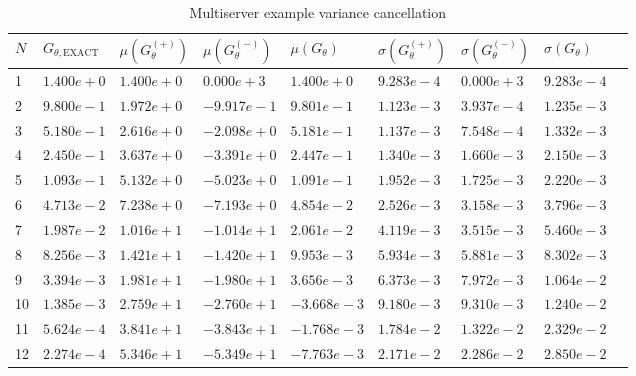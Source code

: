\begin{table}[!htb] 
\begin{center}
\begin{tabular}{@{}lllllllll@{}}
\toprule
    \(N\) &\(G_{\theta,\text{EXACT}}\) & \(\mu(G^{(+)}_\theta)\) & \(\mu(G^{(-)}_\theta)\)  & \(\mu(G_\theta)\) & \(\sigma(G^{(+)}_\theta)\) & \(\sigma(G^{(-)}_\theta)\)  & \(\sigma(G_\theta)\) \\  \midrule
    1 & \(1.400e+0\) &\(1.400e+0\) & \(0.000e+3\) & \(1.400e+0\) & \(9.283e-4\) & \(0.000e+3\) & \(9.283e-4\) &  \\ 
    2 & \(9.800e-1\) &\(1.972e+0\) & \(-9.917e-1\) & \(9.801e-1\) & \(1.123e-3\) & \(3.937e-4\) & \(1.235e-3\) &  \\ 
    3 & \(5.180e-1\) &\(2.616e+0\) & \(-2.098e+0\) & \(5.181e-1\) & \(1.137e-3\) & \(7.548e-4\) & \(1.332e-3\) &  \\ 
    4 & \(2.450e-1\) &\(3.637e+0\) & \(-3.391e+0\) & \(2.447e-1\) & \(1.340e-3\) & \(1.660e-3\) & \(2.150e-3\) &  \\ 
    5 & \(1.093e-1\) &\(5.132e+0\) & \(-5.023e+0\) & \(1.091e-1\) & \(1.952e-3\) & \(1.725e-3\) & \(2.220e-3\) &  \\ 
    6 & \(4.713e-2\) &\(7.238e+0\) & \(-7.193e+0\) & \(4.854e-2\) & \(2.526e-3\) & \(3.158e-3\) & \(3.796e-3\) &  \\ 
    7 & \(1.987e-2\) &\(1.016e+1\) & \(-1.014e+1\) & \(2.061e-2\) & \(4.119e-3\) & \(3.515e-3\) & \(5.460e-3\) &  \\ 
    8 & \(8.256e-3\) &\(1.421e+1\) & \(-1.420e+1\) & \(9.953e-3\) & \(5.934e-3\) & \(5.881e-3\) & \(8.302e-3\) &  \\ 
    9 & \(3.394e-3\) &\(1.981e+1\) & \(-1.980e+1\) & \(3.656e-3\) & \(6.373e-3\) & \(7.972e-3\) & \(1.064e-2\) &  \\ 
    10 & \(1.385e-3\) &\(2.759e+1\) & \(-2.760e+1\) & \(-3.668e-3\) & \(9.180e-3\) & \(9.310e-3\) & \(1.240e-2\) &  \\ 
    11 & \(5.624e-4\) &\(3.841e+1\) & \(-3.843e+1\) & \(-1.768e-3\) & \(1.784e-2\) & \(1.322e-2\) & \(2.329e-2\) &  \\ 
    12 & \(2.274e-4\) &\(5.346e+1\) & \(-5.349e+1\) & \(-7.763e-3\) & \(2.171e-2\) & \(2.286e-2\) & \(2.850e-2\) &  \\ \bottomrule
\end{tabular}
\end{center}
\caption{Multiserver example variance cancellation}
\label{tab:Multiserver_var_cancel}
\end{table} 


